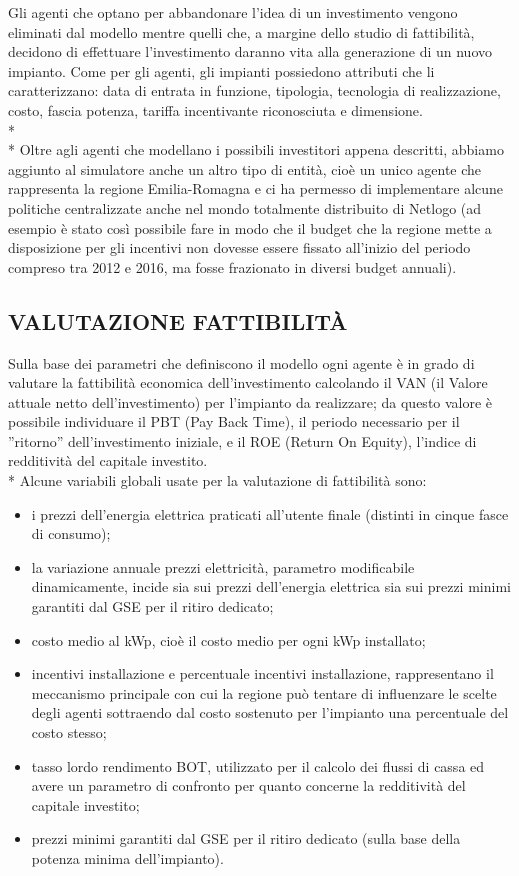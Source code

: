 \documentclass[12pt,a4paper,openright,twoside]{report}
\begin{document}
Gli agenti che optano per abbandonare l'idea di un investimento vengono eliminati dal modello mentre quelli che, a margine dello studio di fattibilità, decidono di effettuare l'investimento daranno vita alla generazione di un nuovo impianto. Come per gli agenti, gli impianti possiedono attributi che li caratterizzano: data di entrata in funzione, tipologia, tecnologia di realizzazione, costo, fascia potenza, tariffa incentivante riconosciuta e dimensione.\\* \\*
Oltre agli agenti che modellano i possibili investitori appena descritti, abbiamo aggiunto al simulatore anche un altro tipo di entità, cioè un unico agente che rappresenta la regione Emilia-Romagna e ci ha permesso di implementare alcune politiche centralizzate anche nel mondo totalmente distribuito di Netlogo (ad esempio è stato così possibile fare in modo che il budget che la regione mette a disposizione per gli incentivi non dovesse essere fissato all'inizio del periodo compreso tra 2012 e 2016, ma fosse frazionato in diversi budget annuali).

\subsection{VALUTAZIONE FATTIBILITÀ}
Sulla base dei parametri che definiscono il modello ogni agente è in grado di valutare la fattibilità economica dell'investimento calcolando il VAN (il Valore attuale netto dell'investimento) per l'impianto da realizzare; da questo valore è possibile individuare il PBT (Pay Back Time), il periodo necessario per il ''ritorno'' dell'investimento iniziale, e il ROE (Return On Equity), l'indice di redditività del capitale investito.\\*
Alcune variabili globali usate per la valutazione di fattibilità sono:
\begin{itemize}
\item i prezzi dell'energia elettrica praticati all'utente finale (distinti in cinque fasce di consumo);
\item la variazione annuale prezzi elettricità, parametro modificabile dinamicamente, incide sia sui prezzi dell'energia elettrica sia sui prezzi minimi garantiti dal GSE per il ritiro dedicato;
\item costo medio al kWp, cioè il costo medio per ogni kWp installato;
\item incentivi installazione e percentuale incentivi installazione, rappresentano il meccanismo principale con cui la regione può tentare di influenzare le scelte degli agenti sottraendo dal costo sostenuto per l'impianto una percentuale del costo stesso;
\item tasso lordo rendimento BOT, utilizzato per il calcolo dei flussi di cassa ed avere un parametro di confronto per quanto concerne la redditività del capitale investito;
\item prezzi minimi garantiti dal GSE per il ritiro dedicato (sulla base della potenza minima dell'impianto).
\end{itemize}
\end{document}

